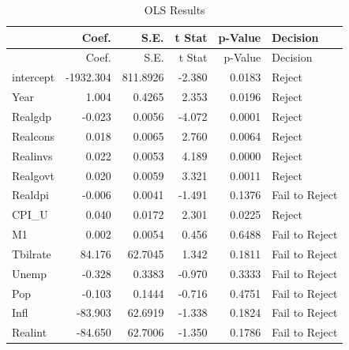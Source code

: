 \documentclass[11pt,]{article}
\newenvironment{Shaded}{\begin{snugshade}}{\end{snugshade}}
\newcommand{\KeywordTok}[1]{\textcolor[rgb]{0.13,0.29,0.53}{\textbf{#1}}}
\newcommand{\DataTypeTok}[1]{\textcolor[rgb]{0.13,0.29,0.53}{#1}}
\newcommand{\DecValTok}[1]{\textcolor[rgb]{0.00,0.00,0.81}{#1}}
\newcommand{\StringTok}[1]{\textcolor[rgb]{0.31,0.60,0.02}{#1}}
\newcommand{\CommentTok}[1]{\textcolor[rgb]{0.56,0.35,0.01}{\textit{#1}}}
\newcommand{\OperatorTok}[1]{\textcolor[rgb]{0.81,0.36,0.00}{\textbf{#1}}}
\newcommand{\NormalTok}[1]{#1}
\begin{document}
\begin{Shaded}
\end{Shaded}

\begin{longtable}[]{@{}lrrrrl@{}}
\caption{OLS Results}\tabularnewline
\toprule
& Coef. & S.E. & t Stat & p-Value & Decision\tabularnewline
\midrule
\endfirsthead
\toprule
& Coef. & S.E. & t Stat & p-Value & Decision\tabularnewline
\midrule
\endhead
intercept & -1932.304 & 811.8926 & -2.380 & 0.0183 &
Reject\tabularnewline
Year & 1.004 & 0.4265 & 2.353 & 0.0196 & Reject\tabularnewline
Realgdp & -0.023 & 0.0056 & -4.072 & 0.0001 & Reject\tabularnewline
Realcons & 0.018 & 0.0065 & 2.760 & 0.0064 & Reject\tabularnewline
Realinvs & 0.022 & 0.0053 & 4.189 & 0.0000 & Reject\tabularnewline
Realgovt & 0.020 & 0.0059 & 3.321 & 0.0011 & Reject\tabularnewline
Realdpi & -0.006 & 0.0041 & -1.491 & 0.1376 & Fail to
Reject\tabularnewline
CPI\_U & 0.040 & 0.0172 & 2.301 & 0.0225 & Reject\tabularnewline
M1 & 0.002 & 0.0054 & 0.456 & 0.6488 & Fail to Reject\tabularnewline
Tbilrate & 84.176 & 62.7045 & 1.342 & 0.1811 & Fail to
Reject\tabularnewline
Unemp & -0.328 & 0.3383 & -0.970 & 0.3333 & Fail to
Reject\tabularnewline
Pop & -0.103 & 0.1444 & -0.716 & 0.4751 & Fail to Reject\tabularnewline
Infl & -83.903 & 62.6919 & -1.338 & 0.1824 & Fail to
Reject\tabularnewline
Realint & -84.650 & 62.7006 & -1.350 & 0.1786 & Fail to
Reject\tabularnewline
\bottomrule
\end{longtable}
\end{document}
